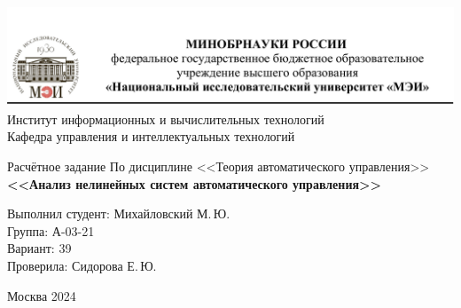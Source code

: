 \begin{titlepage}
	\newpage
	\begin{center}
		\includegraphics[width=\textwidth]{tit.png}
		Институт информационных и вычислительных технологий \\
			Кафедра управления и интеллектуальных технологий
		\vspace{1.25cm}
	\end{center}
	
	\vspace{1.2em}
	
	\begin{center}
		\begin{spacing}{1}
			{\Large Расчётное задание \linebreak
			По дисциплине <<Теория автоматического управления>> \\}
			\large{\bf<<Анализ нелинейных систем автоматического управления>>}
		\end{spacing}
	\end{center}
	
	\vspace{5em}
	

	\vspace{6em}
	
		\noindent Выполнил студент: Михайловский М.\,Ю. \\
		Группа: А-03-21 \\
		Вариант: 39\\
		Проверила: Сидорова Е.\,Ю.
	
	
	\vspace{\fill}
	
	\begin{center}
		Москва 2024
	\end{center}
	
\end{titlepage}